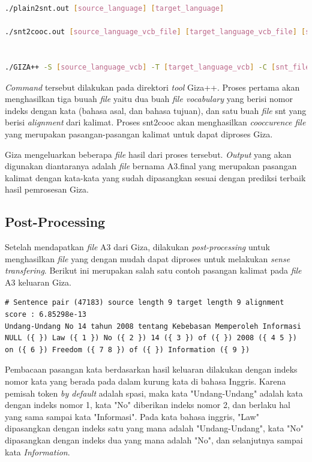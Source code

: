 \begin{lstlisting}[language=bash,caption={\textit{Word  alignment} dengan Giza++}, label={word-alignment}]
./plain2snt.out [source_language] [target_language]

./snt2cooc.out [source_language_vcb_file] [target_language_vcb_file] [snt_file] > [coocurrence_file]


./GIZA++ -S [source_language_vcb] -T [target_language_vcb] -C [snt_file] -CoocurrenceFile [cooc_file]
\end{lstlisting}

\textit{Command} tersebut dilakukan pada direktori \textit{tool} Giza++. Proses pertama akan menghasilkan tiga buuah \textit{file} yaitu dua buah \textit{file vocabulary} yang berisi nomor indeks dengan kata (bahasa asal, dan bahasa tujuan), dan satu buah \textit{file} snt yang berisi \textit{alignment} dari kalimat. Proses snt2cooc akan menghasilkan \textit{cooccurence file} yang merupakan pasangan-pasangan kalimat untuk dapat diproses Giza.

Giza mengeluarkan beberapa \textit{file} hasil dari proses tersebut. \textit{Output} yang akan digunakan diantaranya adalah \textit{file} bernama A3.final yang merupakan pasangan kalimat dengan kata-kata yang sudah dipasangkan sesuai dengan prediksi terbaik hasil pemrosesan Giza.

\subsection{Post-Processing}
Setelah mendapatkan \textit{file} A3 dari Giza, dilakukan \textit{post-processing} untuk menghasilkan \textit{file} yang dengan mudah dapat diproses untuk melakukan \textit{sense transfering}. Berikut ini merupakan salah satu contoh pasangan kalimat pada \textit{file} A3 keluaran Giza.

\begin{lstlisting}[backgroundcolor = \color{white}]
# Sentence pair (47183) source length 9 target length 9 alignment score : 6.85298e-13
Undang-Undang No 14 tahun 2008 tentang Kebebasan Memperoleh Informasi 
NULL ({ }) Law ({ 1 }) No ({ 2 }) 14 ({ 3 }) of ({ }) 2008 ({ 4 5 }) on ({ 6 }) Freedom ({ 7 8 }) of ({ }) Information ({ 9 })
\end{lstlisting}

Pembacaan pasangan kata berdasarkan hasil keluaran dilakukan dengan indeks nomor kata yang berada pada dalam kurung kata di bahasa Inggris. Karena pemisah token \textit{by default} adalah spasi, maka kata "Undang-Undang" adalah kata dengan indeks nomor 1, kata "No" diberikan indeks nomor 2, dan berlaku hal yang sama sampai kata "Informasi". Pada kata bahasa inggris, "Law" dipasangkan dengan indeks satu yang mana adalah "Undang-Undang", kata "No" dipasangkan dengan indeks dua yang mana adalah "No", dan selanjutnya sampai kata \textit{Information}. 

